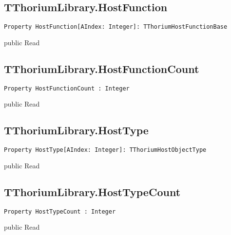 \subsection{TThoriumLibrary.HostFunction}
\label{thoriumcorepkg:thorium:tthoriumlibrary:hostfunction}
\begin{FPCList}
\Declaration 

\begin{verbatim}
Property HostFunction[AIndex: Integer]: TThoriumHostFunctionBase
\end{verbatim}
\Visibility
public
\Access
Read
\end{FPCList}
\subsection{TThoriumLibrary.HostFunctionCount}
\label{thoriumcorepkg:thorium:tthoriumlibrary:hostfunctioncount}
\begin{FPCList}
\Declaration 

\begin{verbatim}
Property HostFunctionCount : Integer
\end{verbatim}
\Visibility
public
\Access
Read
\end{FPCList}
\subsection{TThoriumLibrary.HostType}
\label{thoriumcorepkg:thorium:tthoriumlibrary:hosttype}
\begin{FPCList}
\Declaration 

\begin{verbatim}
Property HostType[AIndex: Integer]: TThoriumHostObjectType
\end{verbatim}
\Visibility
public
\Access
Read
\end{FPCList}
\subsection{TThoriumLibrary.HostTypeCount}
\label{thoriumcorepkg:thorium:tthoriumlibrary:hosttypecount}
\begin{FPCList}
\Declaration 

\begin{verbatim}
Property HostTypeCount : Integer
\end{verbatim}
\Visibility
public
\Access
Read
\end{FPCList}
